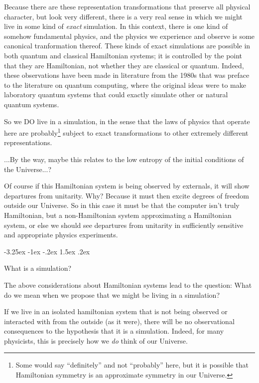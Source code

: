 \documentclass[letterpaper]{article}
\makeatletter
\renewcommand\section{\@startsection {section}{1}{\z@}%
  {-3.25ex \@plus -1ex \@minus -.2ex}%
  {1.5ex \@plus .2ex}%
  {\raggedright\normalfont\large\bfseries}}
\makeatother
\begin{document}
Because there are these representation transformations that preserve all physical character, but look very different, there is a very real sense in which we might live in some kind of \emph{exact} simulation.
In this context, there is one kind of somehow fundamental physics, and the physics we experience and observe is some canonical tranformation thereof.
These kinds of exact simulations are possible in both quantum and classical Hamiltonian systems; it is controlled by the point that they are Hamiltonian, not whether they are classical or quantum.
Indeed, these observations have been made in literature from the 1980s \cite{feynman, feynman2} that was preface to the literature on quantum computing, where the original ideas were to make laboratory quantum systems that could exactly simulate other or natural quantum systems.

So we DO live in a simulation, in the sense that the laws of physics that operate here are probably\footnote{Some would say ``definitely'' and not ``probably'' here, but it is possible that Hamiltonian symmetry is an approximate symmetry in our Universe.} subject to exact transformations to other extremely different representations.

...By the way, maybe this relates to the low entropy of the initial conditions of the Universe...?

Of course if this Hamiltonian system is being observed by externals, it will show departures from unitarity. Why? Because it must then excite degrees of freedom outside our Universe. So in this case it must be that the computer isn't truly Hamiltonian, but a non-Hamiltonian system approximating a Hamiltonian system, or else we should see departures from unitarity in sufficiently sensitive and appropriate physics experiments.

\section{What is a simulation?}\label{sec:definition}

The above considerations about Hamiltonian systems lead to the question: What do we mean when we propose that we might be living in a simulation?

If we live in an isolated hamiltonian system that is not being observed or interacted with from the outside (as it were), there will be no observational consequences to the hypothesis that it is a simulation.
Indeed, for many physicists, this is precisely how we \emph{do} think of our Universe.
\end{document}

